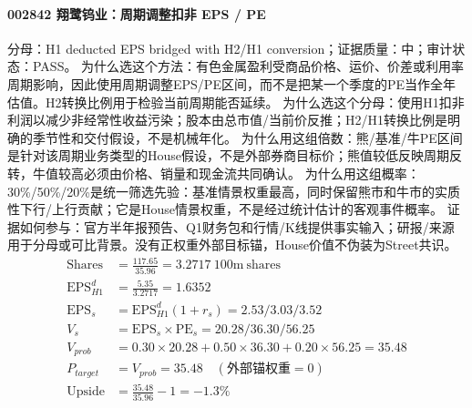 \paragraph{002842 翔鹭钨业：周期调整扣非 EPS / PE}
分母：H1 deducted EPS bridged with H2/H1 conversion；证据质量：中；审计状态：PASS。
为什么选这个方法：有色金属盈利受商品价格、运价、价差或利用率周期影响，因此使用周期调整EPS/PE区间，而不是把某一个季度的PE当作全年估值。H2转换比例用于检验当前周期能否延续。
为什么选这个分母：使用H1扣非利润以减少非经常性收益污染；股本由总市值/当前价反推；H2/H1转换比例是明确的季节性和交付假设，不是机械年化。
为什么用这组倍数：熊/基准/牛PE区间是针对该周期业务类型的House假设，不是外部券商目标价；熊值较低反映周期反转，牛值较高必须由价格、销量和现金流共同确认。
为什么用这组概率：30\%/50\%/20\%是统一筛选先验：基准情景权重最高，同时保留熊市和牛市的实质性下行/上行贡献；它是House情景权重，不是经过统计估计的客观事件概率。
证据如何参与：官方半年报预告、Q1财务包和行情/K线提供事实输入；研报/来源用于分母或可比背景。没有正权重外部目标锚，House价值不伪装为Street共识。
\begin{align*}
\mathrm{Shares} &= \frac{117.65}{35.96}=3.2717\ \mathrm{100m\ shares}\\
\mathrm{EPS}_{H1}^d &= \frac{5.35}{3.2717}=1.6352\\
\mathrm{EPS}_s &= \mathrm{EPS}_{H1}^d(1+r_s)=2.53/3.03/3.52\\
V_s &= \mathrm{EPS}_s\times \mathrm{PE}_s=20.28/36.30/56.25\\
V_{prob} &= 0.30\times 20.28+0.50\times 36.30+0.20\times 56.25=35.48\\
P_{target} &= V_{prob}=35.48\quad(\text{外部锚权重}=0)\\
\mathrm{Upside} &= \frac{35.48}{35.96}-1=-1.3\%\\
\end{align*}

